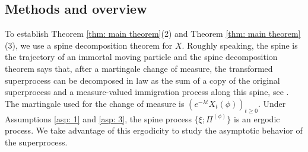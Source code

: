 \documentclass[12pt,a4paper]{amsart}
\theoremstyle{definition}
\numberwithin{equation}{section}
\begin{document}
\subsection{Methods and overview}
	
To establish Theorem \ref{thm: main theorem}(2) and Theorem \ref{thm: main theorem}(3), we use a spine decomposition theorem for 	$X$.
  Roughly speaking, the spine is the trajectory of an immortal moving particle and the spine decomposition theorem says that, after a martingale change of measure, the transformed superprocess can be decomposed in law as the sum of a copy of the original superprocess and a measure-valued immigration process along this spine, see \cite{EckhoffKyprianouWinkel2015Spines, EnglanderKyprianou2004Local, LiuRenSong2009Llog}.
The martingale used for the change of measure is $(e^{-\lambda t} X_t(\phi))_{t\geq 0}$.
Under Assumptions \ref{asp: 1} and \ref{asp: 3}, the spine process $\{\xi; \Pi^{(\phi)}\}$ is an ergodic process.
We take advantage of this ergodicity to study the asymptotic behavior of the superprocess.
	
\end{document}
